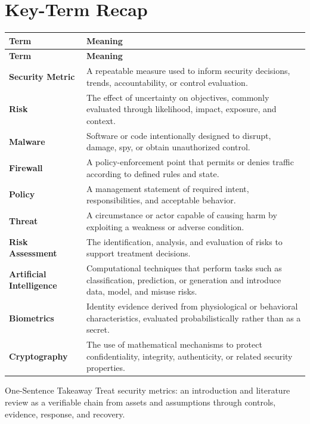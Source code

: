 \documentclass[11pt,letterpaper]{article}
\begin{document}
\section*{Key-Term Recap}
\begin{longtable}{>{\raggedright\arraybackslash}p{}>{\raggedright\arraybackslash}p{}}
\toprule\rowcolor{Navy}\color{white}\textbf{Term} & \color{white}\textbf{Meaning}\\\midrule
\endfirsthead
\toprule\rowcolor{Navy}\color{white}\textbf{Term} & \color{white}\textbf{Meaning}\\\midrule
\endhead
\textbf{Security Metric} & A repeatable measure used to inform security decisions, trends, accountability, or control evaluation. \\\midrule
\textbf{Risk} & The effect of uncertainty on objectives, commonly evaluated through likelihood, impact, exposure, and context. \\\midrule
\textbf{Malware} & Software or code intentionally designed to disrupt, damage, spy, or obtain unauthorized control. \\\midrule
\textbf{Firewall} & A policy-enforcement point that permits or denies traffic according to defined rules and state. \\\midrule
\textbf{Policy} & A management statement of required intent, responsibilities, and acceptable behavior. \\\midrule
\textbf{Threat} & A circumstance or actor capable of causing harm by exploiting a weakness or adverse condition. \\\midrule
\textbf{Risk Assessment} & The identification, analysis, and evaluation of risks to support treatment decisions. \\\midrule
\textbf{Artificial Intelligence} & Computational techniques that perform tasks such as classification, prediction, or generation and introduce data, model, and misuse risks. \\\midrule
\textbf{Biometrics} & Identity evidence derived from physiological or behavioral characteristics, evaluated probabilistically rather than as a secret. \\\midrule
\textbf{Cryptography} & The use of mathematical mechanisms to protect confidentiality, integrity, authenticity, or related security properties. \\\midrule
\bottomrule
\end{longtable}
\begin{CornellExamBox}{One-Sentence Takeaway}
Treat security metrics: an introduction and literature review as a verifiable chain from assets and assumptions through controls, evidence, response, and recovery.
\end{CornellExamBox}
\end{document}

